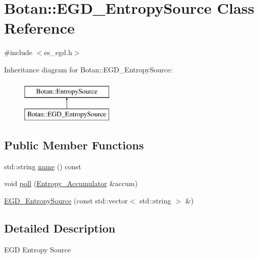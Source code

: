 \hypertarget{classBotan_1_1EGD__EntropySource}{\section{Botan\-:\-:E\-G\-D\-\_\-\-Entropy\-Source Class Reference}
\label{classBotan_1_1EGD__EntropySource}
}


{\ttfamily \#include $<$es\-\_\-egd.\-h$>$}

Inheritance diagram for Botan\-:\-:E\-G\-D\-\_\-\-Entropy\-Source\-:\begin{figure}[H]
\begin{center}
\leavevmode
\includegraphics[height=2.000000cm]{classBotan_1_1EGD__EntropySource}
\end{center}
\end{figure}
\subsection*{Public Member Functions}
\begin{DoxyCompactItemize}
\item 
std\-::string \hyperlink{classBotan_1_1EGD__EntropySource_a0b6d83076cc4517d2f20db88797f97f3}{name} () const 
\item 
void \hyperlink{classBotan_1_1EGD__EntropySource_aa3d9a662f231f35a9aa7cc2f597d1d3c}{poll} (\hyperlink{classBotan_1_1Entropy__Accumulator}{Entropy\-\_\-\-Accumulator} \&accum)
\item 
\hyperlink{classBotan_1_1EGD__EntropySource_aa671a8cd27be3ee5598e318c1680da66}{E\-G\-D\-\_\-\-Entropy\-Source} (const std\-::vector$<$ std\-::string $>$ \&)
\end{DoxyCompactItemize}


\subsection{Detailed Description}
E\-G\-D Entropy Source 


